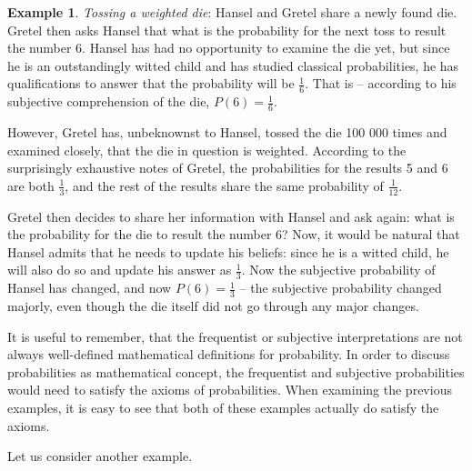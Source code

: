 \documentclass[12pt,a4paper,leqno]{report}
\theoremstyle{plain}
\theoremstyle{definition}
\newtheorem{esim}[equation]{Example}
\begin{document}
\begin{esim} \emph{Tossing a weighted die}:
Hansel and Gretel share a newly found die. Gretel then asks Hansel that what is the probability for the next toss to result the number $6$. Hansel has had no opportunity to examine the die yet, but since he is an outstandingly witted child and has studied classical probabilities, he has qualifications to answer that the probability will be $\frac{1}{6}$. That is -- according to his subjective comprehension of the die, $P(6) = \frac{1}{6}$. 

However, Gretel has, unbeknownst to Hansel, tossed the die 100 000 times and examined closely, that the die in question is weighted. According to the surprisingly exhaustive notes of Gretel, the probabilities for the results 5 and 6 are both $\frac{1}{3}$, and the rest of the results share the same probability of $\frac{1}{12}$.

Gretel then decides to share her information with Hansel and ask again: what is the probability for the die to result the number $6$? Now, it would be natural that Hansel admits that he needs to update his beliefs: since he is a witted child, he will also do so and update his answer as $\frac{1}{3}$. Now the subjective probability of Hansel has changed, and now $P(6) = \frac{1}{3}$ -- the subjective probability changed majorly, even though the die itself did not go through any major changes.
\end{esim}

It is useful to remember, that the frequentist or subjective interpretations are not always well-defined mathematical definitions for probability. In order to discuss probabilities as mathematical concept, the frequentist and subjective probabilities would need to satisfy the axioms of probabilities. When examining the previous examples, it is easy to see that both of these examples actually do satisfy the axioms.

Let us consider another example.
\end{document}
